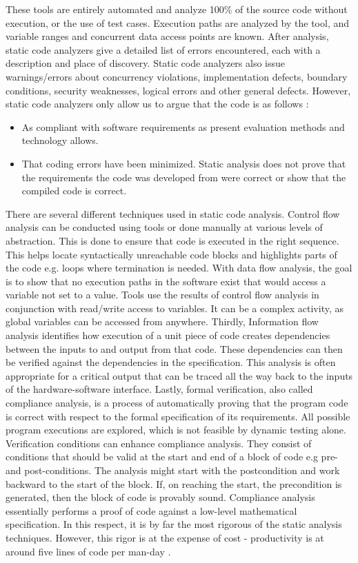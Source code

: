 These tools are entirely automated and analyze 100\% of the source code without execution, or the use of test cases. Execution paths are analyzed by the tool, and variable ranges and concurrent data access points are known. After analysis, static code analyzers give a detailed list of errors encountered, each with a description and place of discovery. Static code analyzers also issue warnings/errors about concurrency violations, implementation defects, boundary conditions, security weaknesses, logical errors and other general defects. However, static code analyzers only allow us to argue that the code is as follows \cite{german2003software} :

\begin{itemize}
	\item As compliant with software requirements as present evaluation methods and technology allows. 
	\item That coding errors have been minimized. Static analysis does not prove that the requirements the code was developed from were correct or show that the compiled code is correct.
\end{itemize}

There are several different techniques used in static code analysis. Control flow analysis can be conducted using tools or done manually at various levels of abstraction. This is done to ensure that code is executed in the right sequence. This helps locate syntactically unreachable code blocks and highlights parts of the code e.g. loops where termination is needed. With data flow analysis, the goal is to show that no execution paths in the software exist that would access a variable not set to a value. Tools use the results of control flow analysis in conjunction with read/write access to variables. It can be a complex activity, as global variables can be accessed from anywhere. Thirdly, Information flow analysis identifies how execution of a unit piece of code creates dependencies between the inputs to and output from that code. These dependencies can then be verified against the dependencies in the specification. This analysis is often appropriate for a critical output that can be traced all the way back to the inputs of the hardware-software interface. Lastly, formal verification, also called compliance analysis, is a process of automatically proving that the program code is correct with respect to the formal specification of its requirements. All possible program executions are explored, which is not feasible by dynamic testing alone. Verification conditions can enhance compliance analysis. They consist of conditions that should be valid at the start and end of a block of code e.g pre- and post-conditions.  The analysis might start with the postcondition and work backward to the start of the block. If, on reaching the start, the precondition is generated, then the block of code is provably sound. Compliance analysis essentially performs a proof of code against a low-level mathematical specification. In this respect, it is by far the most rigorous of the static analysis techniques. However, this rigor is at the expense of cost - productivity is at around five lines of code per man-day \cite{german2003software}.

